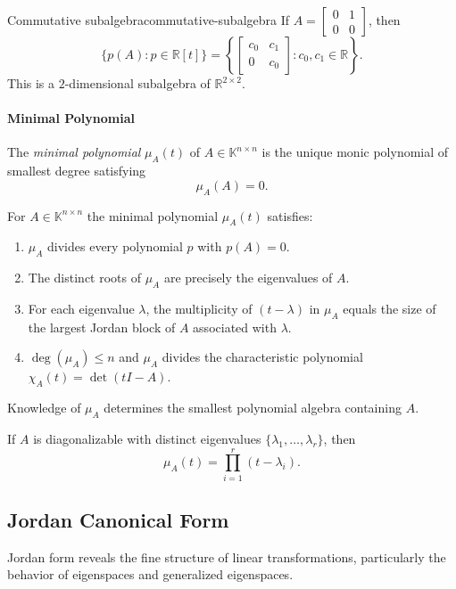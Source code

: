 \documentclass[../../main.tex]{subfiles}
\begin{document}
\begin{example}{Commutative subalgebra}{commutative-subalgebra}
    If $A=\begin{bmatrix}0&1\\0&0\end{bmatrix}$, then
    \[
        \{p(A):p\in\mathbb{R}[t]\}=\left\{\begin{bmatrix}c_0&c_1\\0&c_0\end{bmatrix}:c_0,c_1\in\mathbb{R}\right\}.
    \]
    This is a $2$-dimensional subalgebra of $\mathbb{R}^{2\times 2}$.
\end{example}

\paragraph{Minimal Polynomial}
The \emph{minimal polynomial} $\mu_A(t)$ of $A\in\mathbb{K}^{n\times n}$ is the unique monic polynomial of smallest degree satisfying
\[
    \mu_A(A)=0.
\]

For $A\in\mathbb{K}^{n\times n}$ the minimal polynomial $\mu_A(t)$ satisfies:
\begin{enumerate}
    \item $\mu_A$ divides every polynomial $p$ with $p(A)=0$.
    \item The distinct roots of $\mu_A$ are precisely the eigenvalues of $A$.
    \item For each eigenvalue $\lambda$, the multiplicity of $(t-\lambda)$ in $\mu_A$ equals the size of the largest Jordan block of $A$ associated with $\lambda$.
    \item $\deg(\mu_A)\le n$ and $\mu_A$ divides the characteristic polynomial $\chi_A(t)=\det(tI-A)$.
\end{enumerate}
Knowledge of $\mu_A$ determines the smallest polynomial algebra containing $A$.

\begin{example}
    If $A$ is diagonalizable with distinct eigenvalues $\{\lambda_1,\dots,\lambda_r\}$, then
    \[
        \mu_A(t)=\prod_{i=1}^r (t-\lambda_i).
    \]
\end{example}

\subsection{Jordan Canonical Form}

Jordan form reveals the fine structure of linear transformations, particularly the behavior of eigenspaces and generalized eigenspaces.
\end{document}

